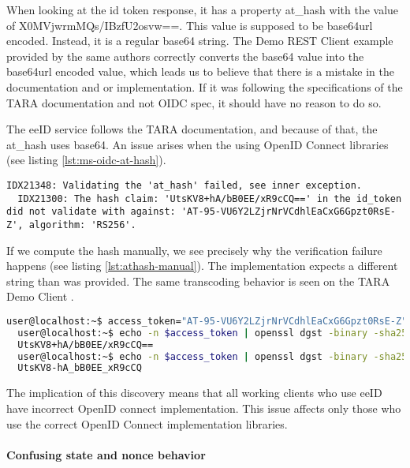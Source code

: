When looking at the id token response, it has a property at\_hash with the value of {X0MVjwrmMQs/IBzfU2osvw==}. This value is supposed to be base64url encoded. Instead, it is a regular base64 string. The Demo REST Client example provided by the same authors \cite{tara-demorest} correctly converts the base64 value into the base64url encoded value, which leads us to believe that there is a mistake in the documentation and or implementation. If it was following the specifications of the TARA documentation and not OIDC spec, it should have no reason to do so.

The eeID service follows the TARA documentation, and because of that, the at\_hash uses base64. An issue arises when the using OpenID Connect libraries (see listing \ref{lst:ms-oidc-at-hash}).

\begin{lstlisting}[caption={Microsoft.IdentityModel.Protocols.OpenIdConnect fails to validate at\_hash}, label={lst:ms-oidc-at-hash}]
  IDX21348: Validating the 'at_hash' failed, see inner exception.
  IDX21300: The hash claim: 'UtsKV8+hA/bB0EE/xR9cCQ==' in the id_token did not validate with against: 'AT-95-VU6Y2LZjrNrVCdhlEaCxG6Gpzt0RsE-Z', algorithm: 'RS256'.
\end{lstlisting}

If we compute the hash manually, we see precisely why the verification failure happens (see listing \ref{lst:athash-manual}). The implementation expects a different string than was provided. The same transcoding behavior is seen on the TARA Demo Client \cite{tara-demorest}.

\begin{lstlisting}[caption={Verifying at\_hash manually}, label={lst:athash-manual}, language={bash}]
  user@localhost:~$ access_token="AT-95-VU6Y2LZjrNrVCdhlEaCxG6Gpzt0RsE-Z"
  user@localhost:~$ echo -n $access_token | openssl dgst -binary -sha256 | head -c 16 | base64
  UtsKV8+hA/bB0EE/xR9cCQ==
  user@localhost:~$ echo -n $access_token | openssl dgst -binary -sha256 | head -c 16 | base64 | tr '/+' '_-' | tr -d '='
  UtsKV8-hA_bB0EE_xR9cCQ
\end{lstlisting}

The implication of this discovery means that all working clients who use eeID have incorrect OpenID connect implementation. This issue affects only those who use the correct OpenID Connect implementation libraries.

\paragraph{Confusing state and nonce behavior}

